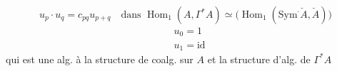
\[
\boxed{u_p\cdot u_q=c_{pq}u_{p+q}}\quad
\text{dans }\operatorname{Hom}_{1}(A,\Gamma^{\ast}A)
\simeq\bigl(\operatorname{Hom}_{1}(\mathrm{Sym}^{\cdot}\check A,\check A)\bigr)
\]
\[
\begin{aligned}
&\boxed{u_0=1}\\
&\boxed{u_1=\mathrm{id}}
\end{aligned}
\]
qui est une alg. 
à la structure de coalg. sur $A$
et la structure d'alg. de $\Gamma^{\ast}A$
